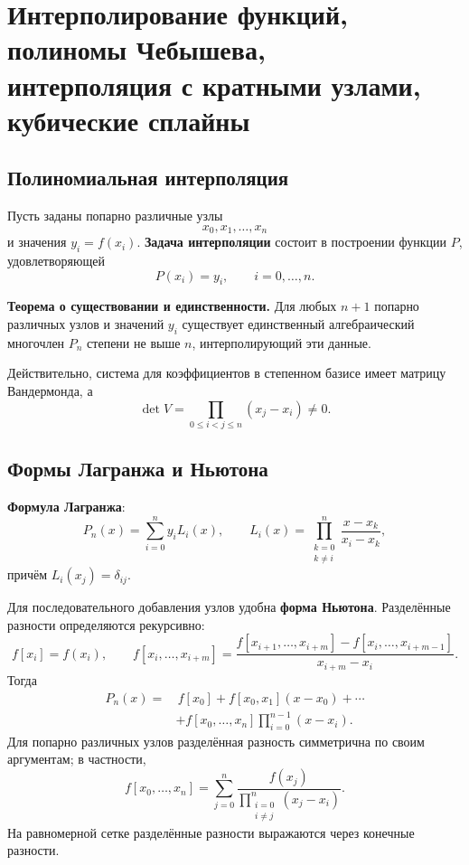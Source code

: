 \section[Интерполирование функций, полиномы Чебышева, интерполяция с кратными узлами, кубические сплайны]{Интерполирование функций, полиномы Чебышева,\\ интерполяция с кратными узлами, кубические сплайны}
\label{sec:interpolation-chebyshev-hermite-splines}

\subsection{Полиномиальная интерполяция}

Пусть заданы попарно различные узлы
\[
x_0,x_1,\ldots,x_n
\]
и значения $y_i=f(x_i)$. \textbf{Задача интерполяции} состоит в построении функции $P$, удовлетворяющей
\[
P(x_i)=y_i,\qquad i=0,\ldots,n.
\]

\textbf{Теорема о существовании и единственности.} Для любых $n+1$ попарно различных узлов и значений $y_i$ существует единственный алгебраический многочлен $P_n$ степени не выше $n$, интерполирующий эти данные.

Действительно, система для коэффициентов в степенном базисе имеет матрицу Вандермонда, а
\[
\det V=\prod_{0\le i<j\le n}(x_j-x_i)\ne0.
\]

\subsection{Формы Лагранжа и Ньютона}

\textbf{Формула Лагранжа}:
\[
P_n(x)=\sum_{i=0}^{n}y_iL_i(x),
\qquad
L_i(x)=\prod_{\substack{k=0\\k\ne i}}^{n}
\frac{x-x_k}{x_i-x_k},
\]
причём $L_i(x_j)=\delta_{ij}$.

Для последовательного добавления узлов удобна \textbf{форма Ньютона}. Разделённые разности определяются рекурсивно:
\[
f[x_i]=f(x_i),
\qquad
f[x_i,\ldots,x_{i+m}]
=
\frac{f[x_{i+1},\ldots,x_{i+m}]-f[x_i,\ldots,x_{i+m-1}]}
{x_{i+m}-x_i}.
\]
Тогда
\[
\begin{split}
P_n(x)=&\,f[x_0]+f[x_0,x_1](x-x_0)+\cdots\\
&+f[x_0,\ldots,x_n]\prod_{i=0}^{n-1}(x-x_i).
\end{split}
\]
Для попарно различных узлов разделённая разность симметрична по своим аргументам; в частности,
\[
f[x_0,\ldots,x_n]
=
\sum_{j=0}^{n}
\frac{f(x_j)}{\displaystyle\prod_{\substack{i=0\\i\ne j}}^{n}(x_j-x_i)}.
\]
На равномерной сетке разделённые разности выражаются через конечные разности.

